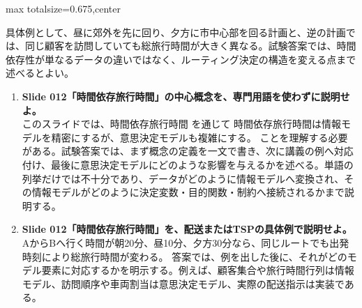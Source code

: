 \begin{adjustbox}{max totalsize={\textwidth}{0.675\textheight},center}
\begin{minipage}{\textwidth}
\begin{minipage}[t]{0.485\textwidth}
具体例として、昼に郊外を先に回り、夕方に市中心部を回る計画と、逆の計画では、同じ顧客を訪問していても総旅行時間が大きく異なる。試験答案では、時間依存性が単なるデータの違いではなく、ルーティング決定の構造を変える点まで述べるとよい。\par
{}
\begin{enumerate}
\item \textbf{Slide 012「時間依存旅行時間」の中心概念を、専門用語を使わずに説明せよ。}\\このスライドでは、時間依存旅行時間 を通じて 時間依存旅行時間は情報モデルを精密にするが、意思決定モデルも複雑にする。 ことを理解する必要がある。試験答案では、まず概念の定義を一文で書き、次に講義の例へ対応付け、最後に意思決定モデルにどのような影響を与えるかを述べる。単語の列挙だけでは不十分であり、データがどのように情報モデルへ変換され、その情報モデルがどのように決定変数・目的関数・制約へ接続されるかまで説明する。
\item \textbf{Slide 012「時間依存旅行時間」を、配送またはTSPの具体例で説明せよ。}\\AからBへ行く時間が朝20分、昼10分、夕方30分なら、同じルートでも出発時刻により総旅行時間が変わる。 答案では、例を出した後に、それがどのモデル要素に対応するかを明示する。例えば、顧客集合や旅行時間行列は情報モデル、訪問順序や車両割当は意思決定モデル、実際の配送指示は実装である。
\end{enumerate}
\end{minipage}
\end{minipage}
\end{adjustbox}

